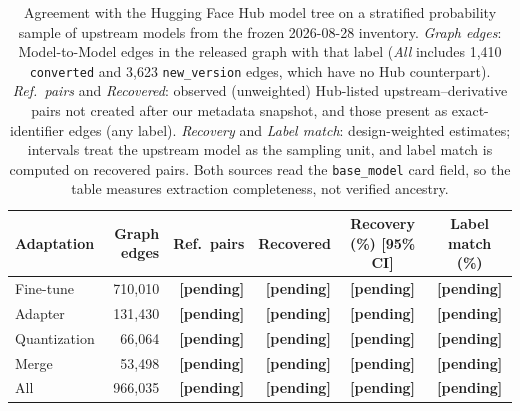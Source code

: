 %

\begin{table}[t]
\centering
\small
\caption{Agreement with the Hugging Face Hub model tree on a stratified probability sample of upstream models from the frozen 2026-08-28 inventory.
\emph{Graph edges}: Model-to-Model edges in the released graph with that label (\emph{All} includes 1{,}410 \texttt{converted} and 3{,}623 \texttt{new\_version} edges, which have no Hub counterpart).
\emph{Ref.\ pairs} and \emph{Recovered}: observed (unweighted) Hub-listed upstream--derivative pairs not created after our metadata snapshot, and those present as exact-identifier edges (any label).
\emph{Recovery} and \emph{Label match}: design-weighted estimates; intervals treat the upstream model as the sampling unit, and label match is computed on recovered pairs.
Both sources read the \texttt{base\_model} card field, so the table measures extraction completeness, not verified ancestry.}
\label{tab:hub_agreement}
\begin{tabular}{lrrrcc}
\toprule
Adaptation & Graph edges & Ref.\ pairs & Recovered & Recovery (\%) [95\% CI] & Label match (\%) \\
\midrule
Fine-tune    & 710{,}010 & \textbf{[pending]} & \textbf{[pending]} & \textbf{[pending]} & \textbf{[pending]} \\
Adapter      & 131{,}430 & \textbf{[pending]} & \textbf{[pending]} & \textbf{[pending]} & \textbf{[pending]} \\
Quantization &  66{,}064 & \textbf{[pending]} & \textbf{[pending]} & \textbf{[pending]} & \textbf{[pending]} \\
Merge        &  53{,}498 & \textbf{[pending]} & \textbf{[pending]} & \textbf{[pending]} & \textbf{[pending]} \\
\midrule
All          & 966{,}035 & \textbf{[pending]} & \textbf{[pending]} & \textbf{[pending]} & \textbf{[pending]} \\
\bottomrule
\end{tabular}
\end{table}

